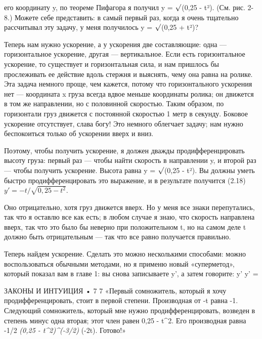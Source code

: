 \documentclass[10pt,oneside]{article}
\begin{document}
его координату y, по теореме Пифагора я получил y = \ensuremath{\sqrt{\vphantom{1}}}(0,25 - t²). (См. рис. 2-8.) Можете себе представить: в самый первый раз, когда я очень тщательно рассчитывал эту задачу, у меня получилось y = \ensuremath{\sqrt{\vphantom{1}}}(0,25 + t²)?\par

Теперь нам нужно ускорение, а у ускорения две составляющие: одна --- горизонтальное ускорение, другая --- вертикальное. Если есть горизонтальное ускорение, то существует и горизонтальная сила, и нам пришлось бы прослеживать ее действие вдоль стержня и выяснять, чему она равна на ролике. Эта задача немного проще, чем кажется, потому что горизонтального ускорения нет --- координата x груза всегда вдвое меньше координаты ролика; он движется в том же направлении, но с половинной скоростью. Таким образом, по горизонтали груз движется с постоянной скоростью 1 метр в секунду. Боковое ускорение отсутствует, слава богу! Это немного облегчает задачу; нам нужно беспокоиться только об ускорении вверх и вниз.\par

Поэтому, чтобы получить ускорение, я должен дважды продифференцировать высоту груза: первый раз --- чтобы найти скорость в направлении y, и второй раз --- чтобы получить ускорение. Высота равна y = \ensuremath{\sqrt{\vphantom{1}}}(0,25 - t²). Вы должны уметь быстро продифференцировать это выражение, и в результате получится (2.18) \(y' = -t / \sqrt{0,25 - t^2}\).\par

Оно отрицательно, хотя груз движется вверх. Но у меня все знаки перепутались, так что я оставлю все как есть; в любом случае я знаю, что скорость направлена вверх, так что это было бы неверно при положительном t, но на самом деле t должно быть отрицательным --- так что все равно получается правильно.\par

Теперь найдем ускорение. Сделать это можно несколькими способами: можно воспользоваться обычными методами, но я применю новый «суперметод», который показал вам в главе 1: вы снова записываете y', а затем говорите: y' y' =\par

ЗАКОНЫ И ИНТУИЦИЯ • 7 7 «Первый сомножитель, который я хочу продифференцировать, стоит в первой степени. Производная от -t равна -1. Следующий сомножитель, который мне нужно продифференцировать, возведен в степень минус одна вторая; этот член равен 0,25 - t\textasciicircum{}2. Его производная равна -1/2 \emph{ (0,25 - t\textasciicircum{}2)\textasciicircum{}(-3/2) } (-2t). Готово!»\par
\end{document}
